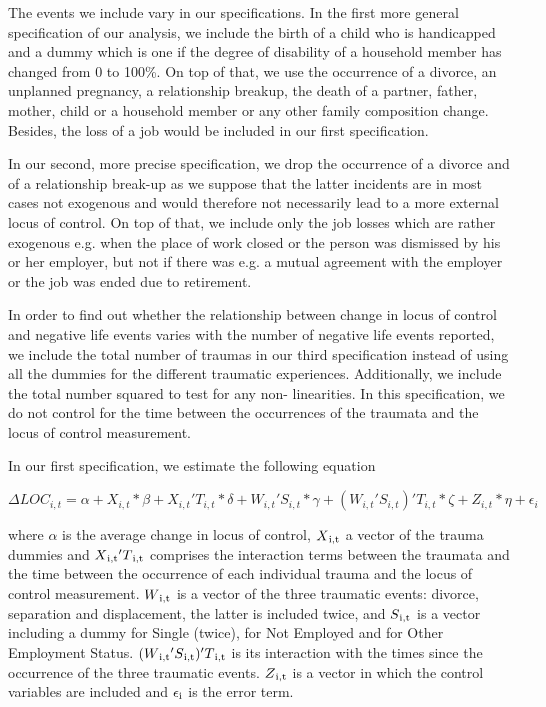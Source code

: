 \documentclass[12pt, a4paper, fleqn, parskip]{scrartcl}
\begin{document}
The events we include vary in our specifications. In the first more general
specification of our analysis, we include the birth of a child who is handicapped and a
dummy which is one if the degree of disability of a household member has changed from 0
to 100\%. On top of that, we use the occurrence of a divorce, an unplanned pregnancy, a
relationship breakup, the death of a partner, father, mother, child or a household
member or any other family composition change. Besides, the loss of a job would be
included in our first specification.

In our second, more precise specification, we drop the occurrence of a divorce and of a
relationship break-up as we suppose that the latter incidents are in most cases not
exogenous and would therefore not necessarily lead to a more external locus of control.
On top of that, we include only the job losses which are rather exogenous e.g. when the
place of work closed or the person was dismissed by his or her employer, but not if
there was e.g. a mutual agreement with the employer or the job was ended due to
retirement.

In order to find out whether the relationship between change in locus of control and
negative life events varies with the number of negative life events reported, we include
the total number of traumas in our third specification instead of using all the dummies
for the different traumatic experiences. Additionally, we include the total number
squared to test for any non- linearities. In this specification, we do not control for
the time between the occurrences of the traumata and the locus of control measurement.

In our first specification, we estimate the following equation

\begin{center}
    $ \Delta LOC_{i,t}= \alpha + X_{i,t} * \beta  + X_{i,t} ' T_{i,t} * \delta + W_{i,t} ' S_{i,t} * \gamma + (W_{i,t}' S_{i,t}) ' T_{i,t} * \zeta + Z_{i,t} * \eta + \epsilon_{i}  $
\end{center}

where $\alpha$ is the average change in locus of control, $ X\textsubscript{i,t}$ a
vector of the trauma dummies and $ X \textsubscript{i,t} ' T \textsubscript{i,t}$
comprises the interaction terms between the traumata and the time between the occurrence
of each individual trauma and the locus of control measurement. $ W \textsubscript{i,t}$
is a vector of the three traumatic events: divorce, separation and displacement, the
latter is included twice, and $ S \textsubscript{i,t} $ is a vector including a dummy
for Single (twice), for Not Employed and for Other Employment Status. $(W
\textsubscript{i,t} ' S \textsubscript{i,t}) ' T \textsubscript{i,t} $ is its
interaction with the times since the occurrence of the three traumatic events. $ Z
\textsubscript{i,t}$ is a vector in which the control variables are included and
$\epsilon\textsubscript{i}$ is the error term.
\end{document}
